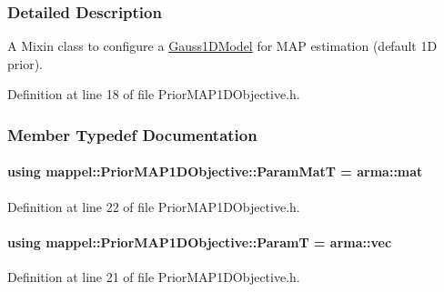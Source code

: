 \subsubsection{Detailed Description}
A Mixin class to configure a \hyperlink{classmappel_1_1Gauss1DModel}{Gauss1\+D\+Model} for M\+AP estimation (default 1D prior). 

Definition at line 18 of file Prior\+M\+A\+P1\+D\+Objective.\+h.



\subsubsection{Member Typedef Documentation}
\paragraph[{\texorpdfstring{Param\+MatT}{ParamMatT}}]{\setlength{\rightskip}{0pt plus 5cm}using {\bf mappel\+::\+Prior\+M\+A\+P1\+D\+Objective\+::\+Param\+MatT} =  arma\+::mat\hspace{0.3cm}{\ttfamily [protected]}}\hypertarget{classmappel_1_1PriorMAP1DObjective_a6bd7c5f78d8bd65ed513003a7289d92f}{}\label{classmappel_1_1PriorMAP1DObjective_a6bd7c5f78d8bd65ed513003a7289d92f}


Definition at line 22 of file Prior\+M\+A\+P1\+D\+Objective.\+h.

\paragraph[{\texorpdfstring{ParamT}{ParamT}}]{\setlength{\rightskip}{0pt plus 5cm}using {\bf mappel\+::\+Prior\+M\+A\+P1\+D\+Objective\+::\+ParamT} =  arma\+::vec\hspace{0.3cm}{\ttfamily [protected]}}\hypertarget{classmappel_1_1PriorMAP1DObjective_a7be5932169c2c7c9d55a89cc20bbce20}{}\label{classmappel_1_1PriorMAP1DObjective_a7be5932169c2c7c9d55a89cc20bbce20}


Definition at line 21 of file Prior\+M\+A\+P1\+D\+Objective.\+h.



